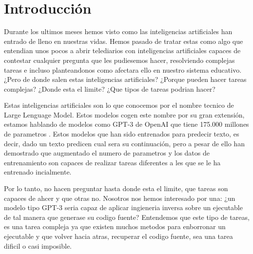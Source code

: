 \chapter{Introducción}
\label{cap:introducion}
\setcounter{page}{1}




Durante los ultimos meses hemos visto como las inteligencias artificiales han entrado de lleno en nuestras vidas. Hemos pasado de tratar estas como algo que entendian
unos pocos a abrir telediarios con inteligencias artificiales capaces de contestar cualquier pregunta que les pudiesemos hacer, resolviendo complejas tareas e incluso
planteandonos como afectara ello en nuestro sistema educativo. ¿Pero de donde salen estas inteligencias artificiales? ¿Porque pueden hacer tareas complejas? 
¿Donde esta el limite? ¿Que tipos de tareas podrian hacer?

Estas inteligencias artificiales son lo que conocemos por el nombre tecnico de Large Lenguage Model. Estos modelos cogen este nombre por su gran extensión, estamos hablando
de modelos como GPT-3 de OpenAI que tiene 175.000 millones de parametros \cite{BrownTomB2020LMaF}. Estos modelos que han sido entrenados para predecir texto, es decir, dado un texto predicen cual sera
su continuación, pero a pesar de ello han demostrado que augmentado el numero de parametros y los datos de entrenamiento son capaces de realizar tareas diferentes a les que se
le ha entrenado incialmente.

Por lo tanto, no hacen preguntar hasta donde esta el limite, que tareas son capaces de ahcer y que otras no. Nosotros nos hemos interesado por una: ¿un modelo tipo GPT-3 seria capaz
de aplicar ingieneria inversa sobre un ejecutable de tal manera que generase su codigo fuente? Entendemos que este tipo de tareas, es una tarea compleja ya que existen muchos
metodos para enborronar un ejecutable y que volver hacia atras, recuperar el codigo fuente, sea una tarea dificil o casi imposible.

